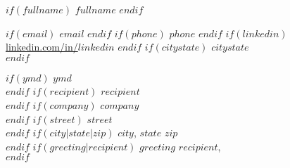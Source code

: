 \begin{center}
$if(fullname)$
{\fontsize{18}{0}\selectfont\scshape $fullname$ \vspace{-0.1in}}
$endif$
\end{center}
\begin{center}
$if(email)$
\href{mailto: $email$}{\faEnvelope\enspace $email$}\hfill
$endif$
$if(phone)$
\href{tel: $phone$}{\faPhone\enspace $phone$}\hfill
$endif$
$if(linkedin)$
\href{https://linkedin.com/in/$linkedin$}{\faLinkedinIn\enspace linkedin.com/in/$linkedin$}\hfill
$endif$
$if(citystate)$
\faMapMarker\enspace $citystate$\\
$endif$
\noindent\makebox[\linewidth]{\rule{\textwidth}{0.5pt}}
\end{center}
\renewcommand{\labelitemi}{-}
$if(ymd)$
$ymd$\vspace{0.1in}\\
$endif$
$if(recipient)$
$recipient$\\
$endif$
$if(company)$
$company$\\
$endif$
$if(street)$
$street$\\
$endif$
$if(city|state|zip)$
$city$, $state$ $zip$\vspace{0.1in}\\
$endif$
$if(greeting|recipient)$
\vspace{-0.1in}$greeting$ $recipient$,\vspace{0.1in}\\
$endif$
\vspace{-0.15in}\setlength\parindent{24pt}

